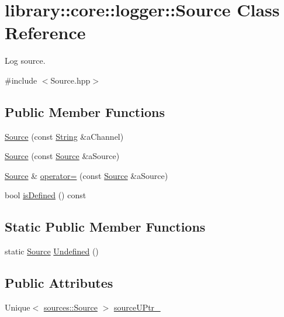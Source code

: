 \hypertarget{classlibrary_1_1core_1_1logger_1_1_source}{}\section{library\+::core\+::logger\+::Source Class Reference}
\label{classlibrary_1_1core_1_1logger_1_1_source}


Log source.  




{\ttfamily \#include $<$Source.\+hpp$>$}

\subsection*{Public Member Functions}
\begin{DoxyCompactItemize}
\item 
\mbox{\hyperlink{classlibrary_1_1core_1_1logger_1_1_source_a2e40fbdae5f8f4dd6a075992f11a939f}{Source}} (const \mbox{\hyperlink{classlibrary_1_1core_1_1types_1_1_string}{String}} \&a\+Channel)
\item 
\mbox{\hyperlink{classlibrary_1_1core_1_1logger_1_1_source_ae9d7e82827aa19efdd1c25d91911a9a6}{Source}} (const \mbox{\hyperlink{classlibrary_1_1core_1_1logger_1_1_source}{Source}} \&a\+Source)
\item 
\mbox{\hyperlink{classlibrary_1_1core_1_1logger_1_1_source}{Source}} \& \mbox{\hyperlink{classlibrary_1_1core_1_1logger_1_1_source_a844032b697c7727ea4e5519fb64fc955}{operator=}} (const \mbox{\hyperlink{classlibrary_1_1core_1_1logger_1_1_source}{Source}} \&a\+Source)
\item 
bool \mbox{\hyperlink{classlibrary_1_1core_1_1logger_1_1_source_ae6316fb0d4e45ea172bdb7004777e9b4}{is\+Defined}} () const
\end{DoxyCompactItemize}
\subsection*{Static Public Member Functions}
\begin{DoxyCompactItemize}
\item 
static \mbox{\hyperlink{classlibrary_1_1core_1_1logger_1_1_source}{Source}} \mbox{\hyperlink{classlibrary_1_1core_1_1logger_1_1_source_a098cba108fe47612f9ddbfb228a5ef8f}{Undefined}} ()
\end{DoxyCompactItemize}
\subsection*{Public Attributes}
\begin{DoxyCompactItemize}
\item 
Unique$<$ \mbox{\hyperlink{classlibrary_1_1core_1_1logger_1_1sources_1_1_source}{sources\+::\+Source}} $>$ \mbox{\hyperlink{classlibrary_1_1core_1_1logger_1_1_source_a9461165d5d581171a044200b58007a3a}{source\+U\+Ptr\+\_\+}}
\end{DoxyCompactItemize}


